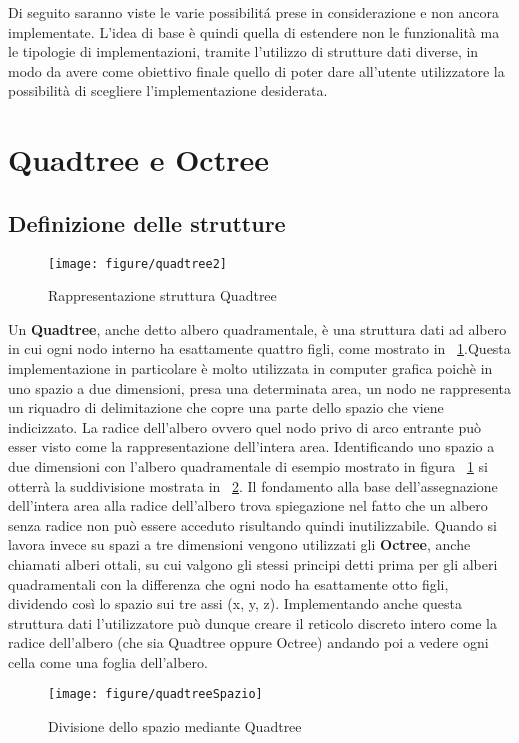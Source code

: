 \large
Di seguito saranno viste le varie possibilit\'a prese in considerazione e non ancora implementate. L'idea di base \`e quindi quella di estendere non le funzionalit\`a ma le tipologie di implementazioni, tramite l'utilizzo di strutture dati diverse, in modo da avere come obiettivo finale quello di poter dare all'utente utilizzatore la possibilit\`a di scegliere l'implementazione desiderata.
\section{Quadtree e Octree}
\subsection{Definizione delle strutture}
\begin{figure}[!htb]
	\begin{center}
		\texttt{[image: figure/quadtree2]}
	\end{center}
	\caption{Rappresentazione struttura Quadtree \label{fig:quadtreeAlbero}}
\end{figure}
Un \textbf{Quadtree}, anche detto albero quadramentale, \`e una struttura dati ad albero in cui ogni nodo interno ha esattamente quattro figli, come mostrato in \figurename~\ref{fig:quadtreeAlbero}.Questa implementazione in particolare \`e molto utilizzata in computer grafica poich\`e in uno spazio a due dimensioni, presa una determinata area, un nodo ne rappresenta un riquadro di delimitazione che copre una parte dello spazio che viene indicizzato. La radice dell'albero ovvero quel nodo privo di arco entrante pu\`o esser visto come la rappresentazione dell'intera area. Identificando uno spazio a due dimensioni con l'albero quadramentale di esempio mostrato in figura \figurename~\ref{fig:quadtreeAlbero} si otterr\`a la suddivisione mostrata in \figurename~\ref{fig:quadtreeSpazio}. Il fondamento alla base dell'assegnazione dell'intera area alla radice dell'albero trova spiegazione nel fatto che un albero senza radice non pu\`o essere acceduto risultando quindi inutilizzabile.
Quando si lavora invece su spazi a tre dimensioni vengono utilizzati gli \textbf{Octree}, anche chiamati alberi ottali, su cui valgono gli stessi principi detti prima per gli alberi quadramentali con la differenza che ogni nodo ha esattamente otto figli, dividendo cos\`i lo spazio sui tre assi (x, y, z). Implementando anche questa struttura dati l'utilizzatore pu\`o dunque creare il reticolo discreto intero come la radice dell'albero (che sia Quadtree oppure Octree) andando poi a vedere ogni cella come una foglia dell'albero.
\begin{figure}[!htb]
	\begin{center}
		\texttt{[image: figure/quadtreeSpazio]}
	\end{center}
	\caption{Divisione dello spazio mediante Quadtree \label{fig:quadtreeSpazio}}
\end{figure}\hfill
